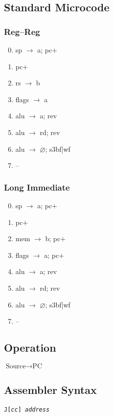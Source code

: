 \documentclass[11pt]{book}
\newcommand*{\instruction}[2][]{%
  \clearpage
  \thispagestyle{fancy}%
  \fancyhf[HL,HR]{\huge{#2}}%
  \fancyhf[HC]{#1}\addtocounter{section}{1}\noindent
}
\let\emptyset\varnothing
\begin{document}
\subsection*{Standard Microcode}
\begin{multicols}{2}\ttfamily\selectfont\small
  \subsubsection*{Reg--Reg}
  \begin{enumerate}\setcounter{enumi}{-1}
  \item sp \(\rightarrow\) a; pc\(+\)
  \item pc\(+\)
  \item rs \(\rightarrow\) b
  \item flags \(\rightarrow\) a
  \item alu \(\rightarrow\) a; rev
  \item alu \(\rightarrow\) rd; rev
  \item alu \(\rightarrow\) \(\emptyset\); s3bf|wf
  \item --
  \end{enumerate}
  \columnbreak
  \subsubsection*{Long Immediate}
  \begin{enumerate}\setcounter{enumi}{-1}
  \item sp \(\rightarrow\) a; pc\(+\)
  \item pc\(+\)
  \item mem \(\rightarrow\) b; pc\(+\)
  \item flags \(\rightarrow\) a; pc\(+\)
  \item alu \(\rightarrow\) a; rev
  \item alu \(\rightarrow\) rd; rev
  \item alu \(\rightarrow\) \(\emptyset\); s3bf|wf
  \item --
  \end{enumerate}
\end{multicols}


\instruction[Jump]{J}
\subsection*{Operation}
\(\text{Source}\rightarrow\text{PC}\)

\subsection*{Assembler Syntax}
\texttt{J[\textit{cc}] \textit{address}}
\end{document}
